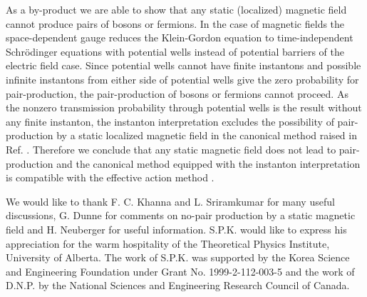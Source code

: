 \documentclass[a4paper,prd,showpacs,preprintnumbers,amsmath,amssymb]{revtex4}
\begin{document}
As a by-product we are able to show that any static (localized)
magnetic field cannot produce pairs of bosons or fermions. In the
case of magnetic fields the space-dependent gauge reduces the
Klein-Gordon equation to time-independent Schr\"{o}dinger
equations with potential wells instead of potential barriers of
the electric field case. Since potential wells cannot have finite
instantons and possible infinite instantons from either side of
potential wells give the zero probability for pair-production, the
pair-production of bosons or fermions cannot proceed. As the
nonzero transmission probability through potential wells is the
result without any finite instanton, the instanton interpretation
excludes the possibility of pair-production by a static localized
magnetic field in the canonical method raised in Ref. \cite{sri}.
Therefore we conclude that any static magnetic field does not lead
to pair-production and the canonical method equipped with the
instanton interpretation is compatible with the effective action
method \cite{dun,sri,dun2}.







\acknowledgements



We would like to thank F. C. Khanna and L. Sriramkumar for many
useful discussions, G. Dunne for comments on no-pair production by
a static magnetic field and H. Neuberger for useful information.
S.P.K. would like to express his appreciation for the warm
hospitality of the Theoretical Physics Institute, University of
Alberta. The work of S.P.K. was supported by the Korea Science and
Engineering Foundation under Grant No. 1999-2-112-003-5 and the
work of  D.N.P. by the National Sciences and Engineering Research
Council of Canada.
\end{document}

